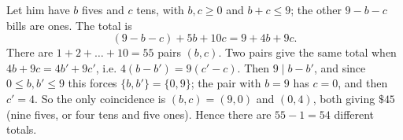 Let him have $b$ fives and $c$ tens, with $b,c\ge0$ and $b+c\le9$; the other $9-b-c$ bills are ones. The total is
\[
(9-b-c)+5b+10c=9+4b+9c .
\]
There are $1+2+\dots+10=55$ pairs $(b,c)$. Two pairs give the same total when $4b+9c=4b'+9c'$, i.e. $4(b-b')=9(c'-c)$. Then $9\mid b-b'$, and since $0\le b,b'\le9$ this forces $\{b,b'\}=\{0,9\}$; the pair with $b=9$ has $c=0$, and then $c'=4$. So the only coincidence is $(b,c)=(9,0)$ and $(0,4)$, both giving $\$45$ (nine fives, or four tens and five ones). Hence there are $55-1=\boxed{54}$ different totals.
